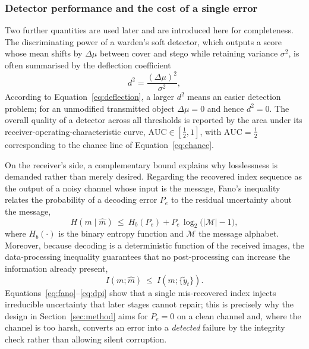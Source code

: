 \documentclass[10pt,a4paper]{article}
\theoremstyle{definition}
\begin{document}
\subsubsection{Detector performance and the cost of a single error}\label{sec:detector}
Two further quantities are used later and are introduced here for completeness. The
discriminating power of a warden's soft detector, which outputs a score whose mean
shifts by $\Delta\mu$ between cover and stego while retaining variance $\sigma^2$,
is often summarised by the deflection coefficient
\begin{equation}
  d^2=\frac{(\Delta\mu)^2}{\sigma^2},
  \label{eq:deflection}
\end{equation}
According to Equation~\eqref{eq:deflection}, a larger $d^2$ means an easier detection problem;
for an unmodified transmitted
object $\Delta\mu=0$ and hence $d^2=0$. The overall quality of a detector across all
thresholds is reported by the area under its receiver-operating-characteristic
curve, $\mathrm{AUC}\in[\tfrac12,1]$, with $\mathrm{AUC}=\tfrac12$ corresponding to
the chance line of Equation~\eqref{eq:chance}.

On the receiver's side, a complementary bound explains why losslessness is
demanded rather than merely desired. Regarding the recovered index sequence as the
output of a noisy channel whose input is the message, Fano's inequality relates the
probability of a decoding error $P_e$ to the residual uncertainty about the message,
\begin{equation}
  H\!\left(m \mid \hat m\right)\ \le\ H_b(P_e)+P_e\,\log_2\!\bigl(|\mathcal{M}|-1\bigr),
  \label{eq:fano}
\end{equation}
where $H_b(\cdot)$ is the binary entropy function and $\mathcal{M}$ the message
alphabet. Moreover, because decoding is a deterministic function of the received
images, the data-processing inequality guarantees that no post-processing can
increase the information already present,
\begin{equation}
  I\!\left(m;\hat m\right)\ \le\ I\!\left(m;\{\tilde y_t\}\right).
  \label{eq:dpi}
\end{equation}
Equations~\eqref{eq:fano}--\eqref{eq:dpi} show that a single mis-recovered index
injects irreducible uncertainty that later stages cannot repair; this is precisely
why the design in Section~\ref{sec:method} aims for $P_e=0$ on a clean channel and,
where the channel is too harsh, converts an error into a \emph{detected} failure by
the integrity check rather than allowing silent corruption.
\end{document}
